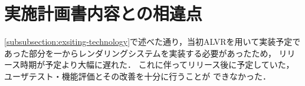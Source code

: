 \section{実施計画書内容との相違点}

\ref{subsubsection:exsiting-technology}で述べた通り，当初ALVRを用いて実装予定で
あった部分を一からレンダリングシステムを実装する必要があったため，
リリース時期が予定より大幅に遅れた．
これに伴ってリリース後に予定していた，ユーザテスト・機能評価とその改善を十分に行うことが
できなかった．
